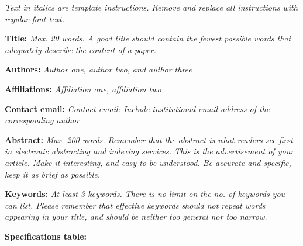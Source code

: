 \documentclass[11pt, letterpaper]{article}
\begin{document}
\begin{flushleft}

\textit{Text in italics are template instructions. Remove and replace all instructions with regular font text.}

\setlength{\parindent}{0pt}
\setlength{\parskip}{10pt}

\textbf{Title:} \textit{Max. 20 words. A good title should contain the fewest possible words that adequately describe the content of a paper.}

\textbf{Authors:} \textit{Author one, author two, and author three}

\textbf{Affiliations:} \textit{Affiliation one, affiliation two}

\textbf{Contact email:} \textit{Contact email: Include institutional email address of the corresponding author}

\textbf{Abstract:} \textit{Max. 200 words. Remember that the abstract is what readers see first in electronic abstracting and indexing services. This is the advertisement of your article. Make it interesting, and easy to be understood. Be accurate and specific, keep it as brief as possible.}

\textbf{Keywords:} \textit{At least 3 keywords. There is no limit on the no. of keywords you can list. Please remember that effective keywords should not repeat words appearing in your title, and should be neither too general nor too narrow.}

\newpage
\textbf{Specifications table:}


\end{flushleft}
\end{document}
